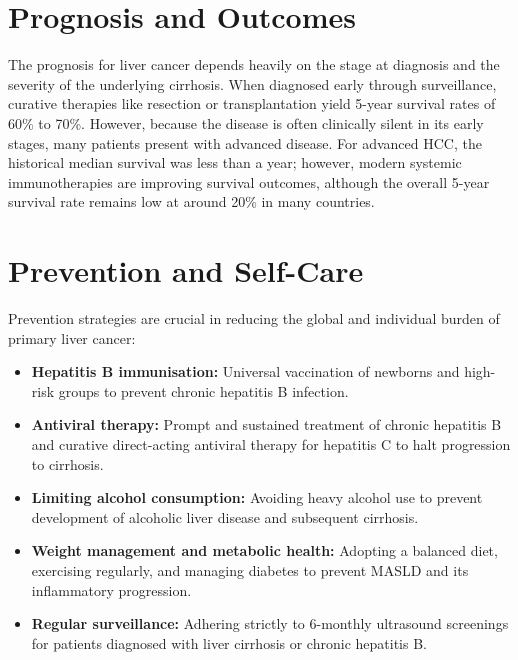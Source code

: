 \section*{Prognosis and Outcomes}
The prognosis for liver cancer depends heavily on the stage at diagnosis and the severity of the underlying cirrhosis. When diagnosed early through surveillance, curative therapies like resection or transplantation yield 5-year survival rates of 60\% to 70\%. However, because the disease is often clinically silent in its early stages, many patients present with advanced disease. For advanced HCC, the historical median survival was less than a year; however, modern systemic immunotherapies are improving survival outcomes, although the overall 5-year survival rate remains low at around 20\% in many countries.

\section*{Prevention and Self-Care}
Prevention strategies are crucial in reducing the global and individual burden of primary liver cancer:
\begin{itemize}
    \item \textbf{Hepatitis B immunisation:} Universal vaccination of newborns and high-risk groups to prevent chronic hepatitis B infection.
    \item \textbf{Antiviral therapy:} Prompt and sustained treatment of chronic hepatitis B and curative direct-acting antiviral therapy for hepatitis C to halt progression to cirrhosis.
    \item \textbf{Limiting alcohol consumption:} Avoiding heavy alcohol use to prevent development of alcoholic liver disease and subsequent cirrhosis.
    \item \textbf{Weight management and metabolic health:} Adopting a balanced diet, exercising regularly, and managing diabetes to prevent MASLD and its inflammatory progression.
    \item \textbf{Regular surveillance:} Adhering strictly to 6-monthly ultrasound screenings for patients diagnosed with liver cirrhosis or chronic hepatitis B.
\end{itemize}

